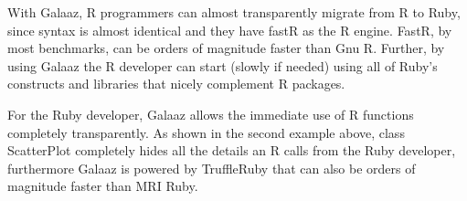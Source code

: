 \documentclass[]{article}
\begin{document}
With Galaaz, R programmers can almost transparently migrate from R to
Ruby, since syntax is almost identical and they have fastR as the R
engine. FastR, by most benchmarks, can be orders of magnitude faster
than Gnu R. Further, by using Galaaz the R developer can start (slowly
if needed) using all of Ruby's constructs and libraries that nicely
complement R packages.

For the Ruby developer, Galaaz allows the immediate use of R functions
completely transparently. As shown in the second example above, class
ScatterPlot completely hides all the details an R calls from the Ruby
developer, furthermore Galaaz is powered by TruffleRuby that can also be
orders of magnitude faster than MRI Ruby.
\end{document}
